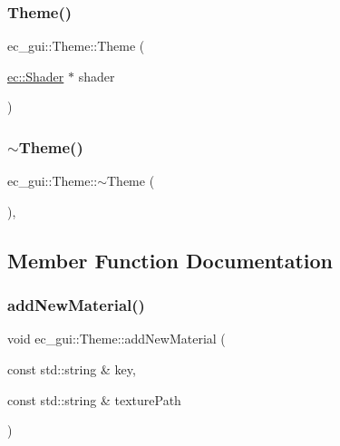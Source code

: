 \subsubsection{\texorpdfstring{Theme()}{Theme()}}
{\footnotesize\ttfamily ec\+\_\+gui\+::\+Theme\+::\+Theme (\begin{DoxyParamCaption}\item[{\mbox{\hyperlink{classec_1_1_shader}{ec\+::\+Shader}} $\ast$}]{shader }\end{DoxyParamCaption})\hspace{0.3cm}{\ttfamily [explicit]}}

\mbox{\label{classec__gui_1_1_theme_a49f870526859d679091067ee73e9881e}} 
\subsubsection{\texorpdfstring{$\sim$\+Theme()}{~Theme()}}
{\footnotesize\ttfamily ec\+\_\+gui\+::\+Theme\+::$\sim$\+Theme (\begin{DoxyParamCaption}{ }\end{DoxyParamCaption})\hspace{0.3cm}{\ttfamily [virtual]}, {\ttfamily [default]}}



\subsection{Member Function Documentation}
\mbox{\label{classec__gui_1_1_theme_a7d194364d05e4a41a64a8ff77c86780d}} 
\subsubsection{\texorpdfstring{add\+New\+Material()}{addNewMaterial()}}
{\footnotesize\ttfamily void ec\+\_\+gui\+::\+Theme\+::add\+New\+Material (\begin{DoxyParamCaption}\item[{const std\+::string \&}]{key,  }\item[{const std\+::string \&}]{texture\+Path }\end{DoxyParamCaption})\hspace{0.3cm}{\ttfamily [protected]}}

